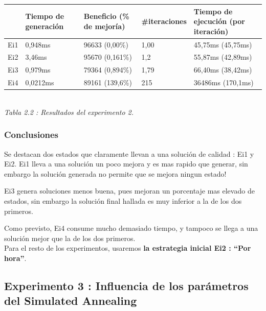 \documentclass{article}
\begin{document}
\begin{center}
\begin{tabular}{|l|l|l|l|l|}
\hline
 & Tiempo de generación & Beneficio (\% de mejoría) & \#iteraciones &
Tiempo de ejecución (por iteración)\\
\hline
Ei1 & 0,948ms & 96633 (0,00\%) & 1,00 & 45,75ms (45,75ms)\\
\hline
Ei2 & 3,46ms & 95670 (0,161\%) & 1,2 & 55,87ms (42,89ms)\\
\hline
Ei3 & 0,979ms & 79364 (0,894\%) & 1,79 & 66,40ms (38,42ms)\\
\hline
Ei4 & 0,0212ms & 89161 (139,6\%) & 215 & 36486ms (170,1ms)\\
\hline
\end{tabular}\\
{\it Tabla 2.2 : Resultados del experimento 2.}
\end{center}

\subsubsection{Conclusiones}

Se destacan dos estados que claramente llevan a una solución de calidad : Ei1 y
Ei2. Ei1 lleva a una solución un poco mejora y es mas rapido que generar, sin
embargo la solución generada no permite que se mejora ningun estado!

Ei3 genera soluciones menos buena, pues mejoran un porcentaje mas elevado de
estados, sin embargo la solución final hallada es muy inferior a la de los dos
primeros.

Como previsto, Ei4 consume mucho demasiado tiempo, y tampoco se llega a una
solución mejor que la de los dos primeros.\\

Para el resto de los experimentos, usaremos \textbf{la estrategia inicial Ei2 : 
``Por hora''}.

\subsection{Experimento 3 : Influencia de los parámetros del Simulated
Annealing}
\end{document}
